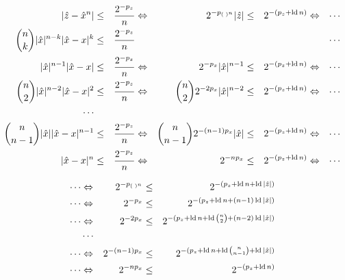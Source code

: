 \begin{scriptsize}
\begin{equation*}
\begin{split}
  |\hat{z}-\hat{x}^n| & \le & \frac{2^{-p_z}}{n}
  & \Leftrightarrow & 
  2^{-{p_{(\phantom{\cdot})^n}}}|\hat{z}| & \le & 2^{-(p_z+\mathop{\rm ld}\nolimits n)}
  & \Leftrightarrow & 
  \cdots
  \\
  \binom{n}{k}|\hat{x}|^{n-k}|\hat{x}-x|^k & \le & \frac{2^{-p_z}}{n}
  &  & &  & &  & 
  \cdots
  \\
  |\hat{x}|^{n-1}|\hat{x}-x| & \le & \frac{2^{-p_z}}{n}
  & \Leftrightarrow & 
  2^{-p_x}|\hat{x}|^{n-1}  & \le & 2^{-(p_z+\mathop{\rm ld}\nolimits n)}
  & \Leftrightarrow & 
  \cdots
  \\
  \binom{n}{2}|\hat{x}|^{n-2}|\hat{x}-x|^2 & \le & \frac{2^{-p_z}}{n}
  & \Leftrightarrow & 
  \binom{n}{2} 2^{-2p_x}|\hat{x}|^{n-2}  & \le & 2^{-(p_z+\mathop{\rm ld}\nolimits n)}
  & \Leftrightarrow & 
  \cdots
  \\
  \cdots
  \\
  \binom{n}{n-1}|\hat{x}||\hat{x}-x|^{n-1} & \le & \frac{2^{-p_z}}{n}
  & \Leftrightarrow & 
  \binom{n}{n-1}2^{-(n-1)p_x}|\hat{x}|  & \le & 2^{-(p_z+\mathop{\rm ld}\nolimits n)}
  & \Leftrightarrow & 
  \cdots
  \\
  |\hat{x}-x|^n & \le & \frac{2^{-p_z}}{n}
  & \Leftrightarrow & 
  2^{-n p_x} & \le & 2^{-(p_z+\mathop{\rm ld}\nolimits n)}
  & \Leftrightarrow & 
  \cdots
  \\
\end{split}
\end{equation*}
\end{scriptsize}

\begin{equation*}
\begin{split}
  \cdots
  & \Leftrightarrow & 
  2^{-p_{(\phantom{\cdot})^n}} & \le & 2^{-(p_z+\mathop{\rm ld}\nolimits n+\mathop{\rm ld}\nolimits|\hat{z}|)}
  \\
  \cdots
  & \Leftrightarrow & 
  2^{-p_x}  & \le & 2^{-(p_z+\mathop{\rm ld}\nolimits n+(n-1)\mathop{\rm ld}\nolimits|\hat{x}|)}
  \\
  \cdots
  & \Leftrightarrow & 
  2^{-2p_x}  & \le & 2^{-(p_z+\mathop{\rm ld}\nolimits n+\mathop{\rm ld}\nolimits\binom{n}{2}+(n-2)\mathop{\rm ld}\nolimits|\hat{x}|)}
  \\
  & \cdots
  \\
  \cdots
  & \Leftrightarrow & 
  2^{-(n-1)p_x}  & \le & 2^{-(p_z+\mathop{\rm ld}\nolimits n+\mathop{\rm ld}\nolimits\binom{n}{n-1}+\mathop{\rm ld}\nolimits|\hat{x}|)}
  \\
  \cdots
  & \Leftrightarrow & 
  2^{-n p_x}  & \le & 2^{-(p_z+\mathop{\rm ld}\nolimits n)}
  \\
\end{split}
\end{equation*}

